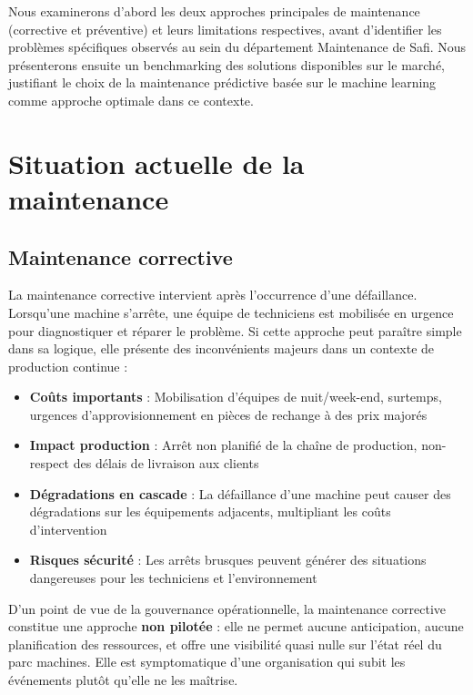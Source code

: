 \documentclass[a4paper,12pt]{report}
\begin{document}
Nous examinerons d'abord les deux approches principales de maintenance (corrective et préventive) et leurs limitations respectives, avant d'identifier les problèmes spécifiques observés au sein du département Maintenance de Safi. Nous présenterons ensuite un benchmarking des solutions disponibles sur le marché, justifiant le choix de la maintenance prédictive basée sur le machine learning comme approche optimale dans ce contexte.

\section{Situation actuelle de la maintenance}

\subsection{Maintenance corrective}

La maintenance corrective intervient après l'occurrence d'une défaillance. Lorsqu'une machine s'arrête, une équipe de techniciens est mobilisée en urgence pour diagnostiquer et réparer le problème. Si cette approche peut paraître simple dans sa logique, elle présente des inconvénients majeurs dans un contexte de production continue :

\begin{itemize}
    \item \textbf{Coûts importants} : Mobilisation d'équipes de nuit/week-end, surtemps, urgences d'approvisionnement en pièces de rechange à des prix majorés
    \item \textbf{Impact production} : Arrêt non planifié de la chaîne de production, non-respect des délais de livraison aux clients
    \item \textbf{Dégradations en cascade} : La défaillance d'une machine peut causer des dégradations sur les équipements adjacents, multipliant les coûts d'intervention
    \item \textbf{Risques sécurité} : Les arrêts brusques peuvent générer des situations dangereuses pour les techniciens et l'environnement
\end{itemize}

D'un point de vue de la gouvernance opérationnelle, la maintenance corrective constitue une approche \textbf{non pilotée} : elle ne permet aucune anticipation, aucune planification des ressources, et offre une visibilité quasi nulle sur l'état réel du parc machines. Elle est symptomatique d'une organisation qui subit les événements plutôt qu'elle ne les maîtrise.
\end{document}
